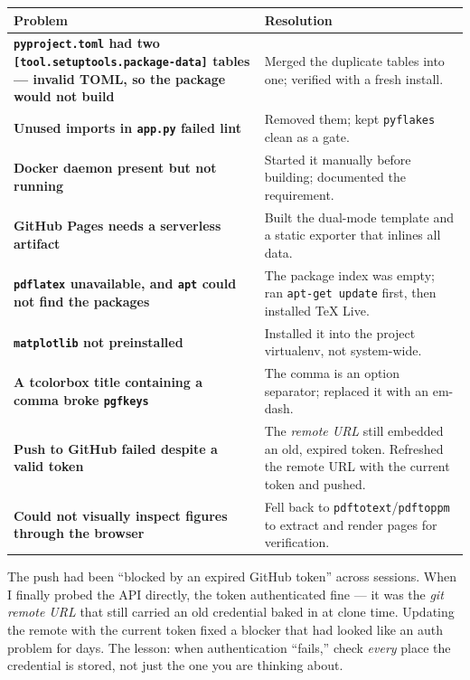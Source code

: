 \documentclass[11pt,a4paper]{article}
\newcommand{\code}[1]{\texttt{\small #1}}
\begin{document}
\begin{center}
\begin{tabularx}{\linewidth}{@{}>{\bfseries}p{4.6cm}X@{}}
\toprule
\rowcolor{paper}\textbf{Problem} & \textbf{Resolution} \\
\midrule
\code{pyproject.toml} had two \code{[tool.setuptools.package-data]} tables --- invalid TOML, so the package would not build & Merged the duplicate tables into one; verified with a fresh install. \\
Unused imports in \code{app.py} failed lint & Removed them; kept \code{pyflakes} clean as a gate. \\
Docker daemon present but not running & Started it manually before building; documented the requirement. \\
GitHub Pages needs a serverless artifact & Built the dual-mode template and a static exporter that inlines all data. \\
\code{pdflatex} unavailable, and \code{apt} could not find the packages & The package index was empty; ran \code{apt-get update} first, then installed TeX Live. \\
\code{matplotlib} not preinstalled & Installed it into the project virtualenv, not system-wide. \\
A tcolorbox title containing a comma broke \code{pgfkeys} & The comma is an option separator; replaced it with an em-dash. \\
Push to GitHub failed despite a valid token & The \emph{remote URL} still embedded an old, expired token. Refreshed the remote URL with the current token and pushed. \\
Could not visually inspect figures through the browser & Fell back to \code{pdftotext}/\code{pdftoppm} to extract and render pages for verification. \\
\bottomrule
\end{tabularx}
\end{center}

\begin{warstory}
The push had been ``blocked by an expired GitHub token'' across sessions. When I
finally probed the API directly, the token authenticated fine --- it was the
\emph{git remote URL} that still carried an old credential baked in at clone
time. Updating the remote with the current token fixed a blocker that had
looked like an auth problem for days. The lesson: when authentication ``fails,''
check \emph{every} place the credential is stored, not just the one you are
thinking about.
\end{warstory}
\end{document}
